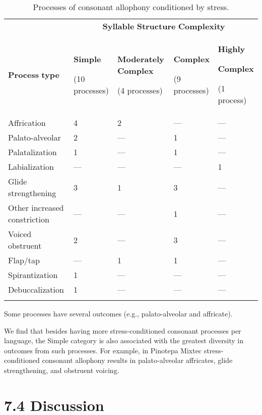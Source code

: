 \begin{table}
\begin{tabularx}{\textwidth}{XXXXX}
\lsptoprule
 & \multicolumn{4}{c}{ \textbf{Syllable} \textbf{Structure} \textbf{Complexity}}\\
 \textbf{Process} \textbf{type} & { \textbf{Simple}}

 (10 processes) & { \textbf{Moderately} \textbf{Complex}}

 (4 processes) & { \textbf{Complex}}

 (9 processes) & { \textbf{Highly} }

{ \textbf{Complex}}

 (1 process)\\
 Affrication & 4 & 2 & — & —\\
 Palato-alveolar & 2 & — & 1 & —\\
 Palatalization & 1 & — & 1 & —\\
 Labialization & — & — & — & 1\\
 Glide strengthening & 3 & 1 & 3 & —\\
 Other increased constriction & — & — & 1 & —\\
 Voiced obstruent & 2 & — & 3 & —\\
 Flap/tap & — & 1 & 1 & —\\
 Spirantization & 1 & — & — & —\\
 Debuccalization & 1 & — & — & —\\
\lspbottomrule
\end{tabularx}
\caption{\label{7.9}Processes of consonant allophony conditioned by stress.}Some processes have several outcomes (e.g., palato-alveolar and affricate).
\end{table}

  We find that besides having more stress-conditioned consonant processes per language, the Simple category is also associated with the greatest diversity in outcomes from such processes. For example, in Pinotepa Mixtec stress-conditioned consonant allophony results in palato-alveolar affricates, glide strengthening, and obstruent voicing.

\section{7.4 Discussion}

